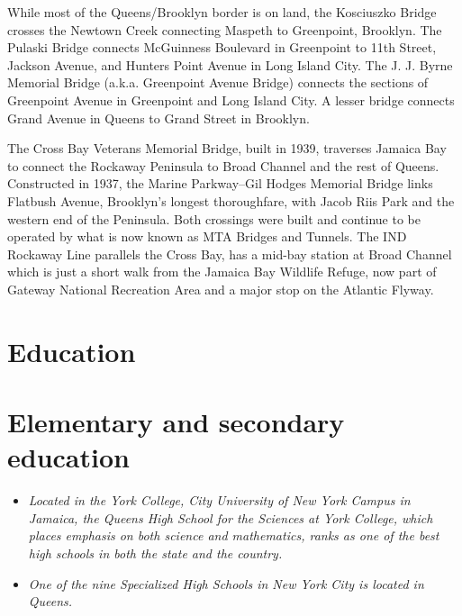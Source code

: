 While most of the Queens/Brooklyn border is on land, the Kosciuszko
Bridge crosses the Newtown Creek connecting Maspeth to Greenpoint,
Brooklyn. The Pulaski Bridge connects McGuinness Boulevard in Greenpoint
to 11th Street, Jackson Avenue, and Hunters Point Avenue in Long Island
City. The J. J. Byrne Memorial Bridge (a.k.a. Greenpoint Avenue Bridge)
connects the sections of Greenpoint Avenue in Greenpoint and Long Island
City. A lesser bridge connects Grand Avenue in Queens to Grand Street in
Brooklyn.

The Cross Bay Veterans Memorial Bridge, built in 1939, traverses Jamaica
Bay to connect the Rockaway Peninsula to Broad Channel and the rest of
Queens. Constructed in 1937, the Marine Parkway--Gil Hodges Memorial
Bridge links Flatbush Avenue, Brooklyn's longest thoroughfare, with
Jacob Riis Park and the western end of the Peninsula. Both crossings
were built and continue to be operated by what is now known as MTA
Bridges and Tunnels. The IND Rockaway Line parallels the Cross Bay, has
a mid-bay station at Broad Channel which is just a short walk from the
Jamaica Bay Wildlife Refuge, now part of Gateway National Recreation
Area and a major stop on the Atlantic Flyway.

\section{Education}\label{education}

\section{Elementary and secondary
education}\label{elementary-and-secondary-education}

\begin{itemize}
\item
  \emph{Located in the York College, City University of New York Campus
  in Jamaica, the Queens High School for the Sciences at York College,
  which places emphasis on both science and mathematics, ranks as one of
  the best high schools in both the state and the country.}
\item
  \emph{One of the nine Specialized High Schools in New York City is
  located in Queens.}
\end{itemize}

